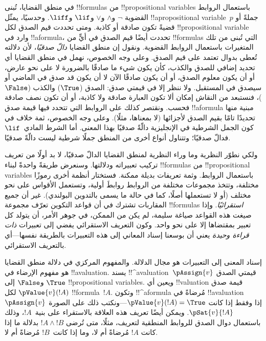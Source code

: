 \documentclass[../../../include/open-logic-section]{subfiles}
\begin{document}


في منطق القضايا، تُبنى !!{formula}s من
!!{propositional variable}s باستعمال الروابط القضوية
$\lnot$ و$\land$ و$\lor$ و$\lif$ و$\liff$. وحدسيًا، يمثّل
!!a{propositional variable}~$p$ جملةً أو قضيةً تكون صادقة أو كاذبة.
ومتى تحددت قيم الصدق لكل !!{propositional variable} وارد في
!!a{formula}، تحددت أيضًا قيم الصدق في أيٍّ من !!{formula}s التي تُبنى
من تلك المتغيرات باستعمال الروابط القضوية. ونقول إن منطق القضايا
\emph{دالّ صدقيًا}، لأن دلالته تُعطى بدوال تعتمد على قيم الصدق. وعلى
وجه الخصوص، نهمل في منطق القضايا أي تحديد إضافي للصدق والكذب، كأن يكون
شيء ما صادقًا
بالضرورة لا على نحو عارض، أو أن يكون معلوم الصدق، أو أن يكون صادقًا
الآن لا أن يكون قد صدق في الماضي أو سيصدق في المستقبل. ولا ننظر إلا
في قيمتي صدق: الصدق ($\True$) والكذب ($\False$)، فنستبعد من النقاش
إمكان ألا تكون العبارة صادقة ولا كاذبة، أو أن تكون نصف صادقة فحسب.
ونقتصر كذلك على الروابط التي تتحدد فيها قيمة صدق !!a{formula} مبنية
منها تحديدًا تامًا بقيم الصدق لأجزائها (لا بمعناها، مثلًا). وعلى وجه
الخصوص، ثمة خلاف في كون الجمل الشرطية في الإنجليزية دالّةً صدقيًا بهذا
المعنى. أما الشرط المادي~$\lif$ فدالّ صدقيًا؛ وتتناول
أنواع أخرى من المنطق جملًا شرطية ليست دالّةً صدقيًا.

ولكي نطوّر النظرية وما وراء النظرية لمنطق القضايا الدالّ صدقيًا، لا بد
أولًا من تعريف تركيب تعبيراته ودلالتها. وسنعرض طريقةً واحدةً لبناء
!!{formula}s من !!{propositional variable}s باستعمال الروابط. وثمة
تعريفات بديلة ممكنة. فستختار أنظمة أخرى رموزًا مختلفة، وتتخذ مجموعات
مختلفة من الروابط روابطَ أولية، وتستعمل الأقواس على نحو مختلف (أو لا
تستعملها أصلًا، كما في حالة ما يسمى بالتدوين البولندي). غير أن جميع
المقاربات تشترك في أن قواعد التكوين تعرّف مجموعة !!{formula}s
\emph{استقرائيًا}. وإذا صيغت هذه القواعد صياغة سليمة، لم يكن من الممكن،
في جوهر الأمر، أن يتولد كل تعبير بمقتضاها إلا على نحو واحد. وكون
التعريف الاستقرائي يفضي إلى تعبيرات \emph{ذات قراءة وحيدة} يعني أن
بوسعنا إسناد المعاني إلى هذه التعبيرات بالطريقة نفسها---أي بالتعريف
الاستقرائي.

إسناد المعنى إلى التعبيرات هو مجال الدلالة. والمفهوم المركزي في دلالة
منطق القضايا هو مفهوم الإرضاء في !!a{valuation}. يسند
!!^a{valuation}~$\pAssign{v}$ قيمتي الصدق $\True$ و$\False$ إلى
!!{propositional variable}s. ويعين أي !!{valuation} قيمة صدق
$\pValue{v}(!A)$ لكل !!{formula}~$!A$. وتكون !!^a{formula} مُرضاةً في
!!a{valuation}~$\pAssign{v}$ إذا وفقط إذا كانت
$\pValue{v}(!A) = \True$---ونكتب ذلك على الصورة $\pSat{v}{!A}$.
ويمكن أيضًا تعريف هذه العلاقة بالاستقراء على بنية~$!A$، وذلك باستعمال
دوال الصدق للروابط المنطقية لتعريف، مثلًا، متى تُرضى $!A \land !B$
بدلالة ما إذا كانت $!A$ مُرضاةً أم لا، وما إذا كانت~$!B$ مُرضاةً أم لا.
\end{document}
